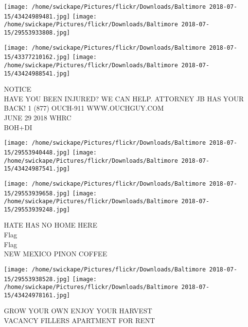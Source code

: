 \documentclass[10pt,letterpaper]{article}
\begin{document}
\texttt{[image: /home/swickape/Pictures/flickr/Downloads/Baltimore 2018-07-15/43424989481.jpg]}
\texttt{[image: /home/swickape/Pictures/flickr/Downloads/Baltimore 2018-07-15/29553933808.jpg]}

\texttt{[image: /home/swickape/Pictures/flickr/Downloads/Baltimore 2018-07-15/43377210162.jpg]}
\texttt{[image: /home/swickape/Pictures/flickr/Downloads/Baltimore 2018-07-15/43424988541.jpg]}

NOTICE\\
HAVE YOU BEEN INJURED?  WE CAN HELP.  ATTORNEY JB HAS YOUR BACK!  1 (877) OUCH{-}911 WWW.OUCHGUY.COM\\
JUNE 29 2018 WHRC\\
BOH+DI\\
\pagebreak

\texttt{[image: /home/swickape/Pictures/flickr/Downloads/Baltimore 2018-07-15/29553940448.jpg]}
\texttt{[image: /home/swickape/Pictures/flickr/Downloads/Baltimore 2018-07-15/43424987541.jpg]}

\texttt{[image: /home/swickape/Pictures/flickr/Downloads/Baltimore 2018-07-15/29553939658.jpg]}
\texttt{[image: /home/swickape/Pictures/flickr/Downloads/Baltimore 2018-07-15/29553939248.jpg]}

HATE HAS NO HOME HERE\\
Flag\\
Flag\\
NEW MEXICO PINON COFFEE\\
\pagebreak

\texttt{[image: /home/swickape/Pictures/flickr/Downloads/Baltimore 2018-07-15/29553938528.jpg]}
\texttt{[image: /home/swickape/Pictures/flickr/Downloads/Baltimore 2018-07-15/43424978161.jpg]}

GROW YOUR OWN ENJOY YOUR HARVEST\\
VACANCY FILLERS APARTMENT FOR RENT\\
\pagebreak
\end{document}
